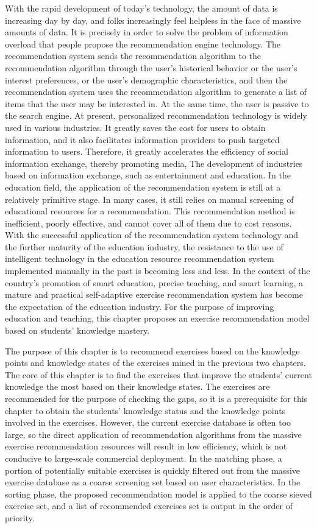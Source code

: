 With the rapid development of today's technology, the amount of data is increasing day by day, and folks increasingly feel helpless in the face of massive amounts of data. It is precisely in order to solve the problem of information overload that people propose the recommendation engine technology. The recommendation system sends the recommendation algorithm to the recommendation algorithm through the user's historical behavior or the user's interest preferences, or the user's demographic characteristics, and then the recommendation system uses the recommendation algorithm to generate a list of items that the user may be interested in. At the same time, the user is passive to the search engine. At present, personalized recommendation technology is widely used in various industries. It greatly saves the cost for users to obtain information, and it also facilitates information providers to push targeted information to users. Therefore, it greatly accelerates the efficiency of social information exchange, thereby promoting media, The development of industries based on information exchange, such as entertainment and education. In the education field, the application of the recommendation system is still at a relatively primitive stage. In many cases, it still relies on manual screening of educational resources for a recommendation. This recommendation method is inefficient, poorly effective, and cannot cover all of them due to cost reasons. With the successful application of the recommendation system technology and the further maturity of the education industry, the resistance to the use of intelligent technology in the education resource recommendation system implemented manually in the past is becoming less and less. In the context of the country's promotion of smart education, precise teaching, and smart learning, a mature and practical self-adaptive exercise recommendation system has become the expectation of the education industry. For the purpose of improving education and teaching, this chapter proposes an exercise recommendation model based on students' knowledge mastery.

The purpose of this chapter is to recommend exercises based on the knowledge points and knowledge states of the exercises mined in the previous two chapters. The core of this chapter is to find the exercises that improve the students' current knowledge the most based on their knowledge states. The exercises are recommended for the purpose of checking the gaps, so it is a prerequisite for this chapter to obtain the students' knowledge status and the knowledge points involved in the exercises.  However, the current exercise database is often too large, so the direct application of recommendation algorithms from the massive exercise recommendation resources will result in low efficiency, which is not conducive to large-scale commercial deployment. In the matching phase, a portion of potentially suitable exercises is quickly filtered out from the massive exercise database as a coarse screening set based on user characteristics. In the sorting phase, the proposed recommendation model is applied to the coarse sieved exercise set, and a list of recommended exercises set is output in the order of priority.


